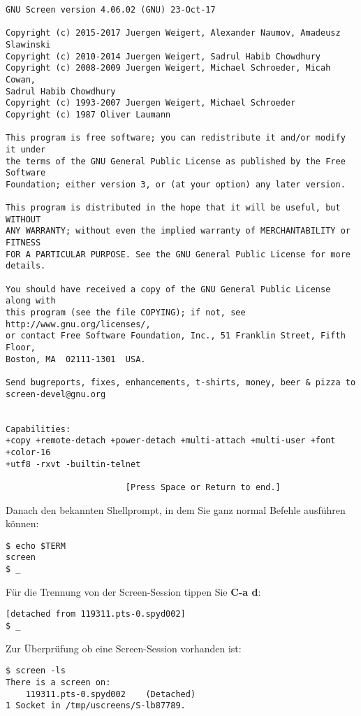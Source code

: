 \documentclass[titlepage,a4paper]{article}
\begin{document}
\begin{verbatim}
GNU Screen version 4.06.02 (GNU) 23-Oct-17

Copyright (c) 2015-2017 Juergen Weigert, Alexander Naumov, Amadeusz Slawinski
Copyright (c) 2010-2014 Juergen Weigert, Sadrul Habib Chowdhury
Copyright (c) 2008-2009 Juergen Weigert, Michael Schroeder, Micah Cowan,
Sadrul Habib Chowdhury
Copyright (c) 1993-2007 Juergen Weigert, Michael Schroeder
Copyright (c) 1987 Oliver Laumann

This program is free software; you can redistribute it and/or modify it under
the terms of the GNU General Public License as published by the Free Software
Foundation; either version 3, or (at your option) any later version.

This program is distributed in the hope that it will be useful, but WITHOUT
ANY WARRANTY; without even the implied warranty of MERCHANTABILITY or FITNESS
FOR A PARTICULAR PURPOSE. See the GNU General Public License for more details.

You should have received a copy of the GNU General Public License along with
this program (see the file COPYING); if not, see http://www.gnu.org/licenses/,
or contact Free Software Foundation, Inc., 51 Franklin Street, Fifth Floor,
Boston, MA  02111-1301  USA.

Send bugreports, fixes, enhancements, t-shirts, money, beer & pizza to
screen-devel@gnu.org


Capabilities:
+copy +remote-detach +power-detach +multi-attach +multi-user +font +color-16
+utf8 -rxvt -builtin-telnet

                        [Press Space or Return to end.]
\end{verbatim}

\noindent
Danach den bekannten Shellprompt, in dem Sie ganz normal Befehle ausführen können:

\begin{verbatim}
$ echo $TERM
screen
$ _
\end{verbatim}

\noindent
Für die Trennung von der Screen-Session tippen Sie \textbf{C-a d}:

\begin{verbatim}
[detached from 119311.pts-0.spyd002]
$ _
\end{verbatim}

\noindent
Zur Überprüfung ob eine Screen-Session vorhanden ist:

\begin{verbatim}
$ screen -ls
There is a screen on:
	119311.pts-0.spyd002	(Detached)
1 Socket in /tmp/uscreens/S-lb87789.
\end{verbatim}
\end{document}
